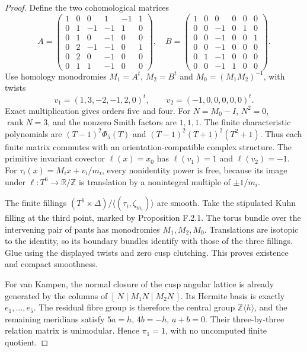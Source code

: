 \begin{proof}
Define the two cohomological matrices
\[
A=\begin{pmatrix}
1&0&0&1&-1&1\\0&1&-1&-1&1&0\\0&1&0&-1&0&0\\
0&2&-1&-1&0&1\\0&2&0&-1&0&0\\0&1&1&-1&0&0
\end{pmatrix},\quad
B=\begin{pmatrix}
1&0&0&0&0&0\\0&0&-1&0&1&0\\0&0&-1&0&0&1\\
0&0&-1&0&0&0\\0&1&-1&0&0&0\\0&0&-1&1&0&0
\end{pmatrix}.
\]
Use homology monodromies $M_1=A^t$, $M_2=B^t$ and
$M_0=(M_1M_2)^{-1}$, with twists
\[
 v_1=(1,3,-2,-1,2,0)^t,\qquad v_2=(-1,0,0,0,0,0)^t .
\]
Exact multiplication gives orders five and four.  For $N=M_0-I$,
$N^2=0$, $\operatorname{rank}N=3$, and the nonzero Smith factors
are $1,1,1$.  The finite characteristic polynomials are
$(T-1)^2\Phi_5(T)$ and $(T-1)^2(T+1)^2(T^2+1)$.
Thus each finite matrix commutes with an orientation-compatible
complex structure.  The primitive invariant covector
$\ell(x)=x_0$ has $\ell(v_1)=1$ and $\ell(v_2)=-1$.
For $\tau_i(x)=M_ix+v_i/m_i$, every nonidentity power is free,
because its image under $\ell:T^6\to\mathbb R/\mathbb Z$ is
translation by a nonintegral multiple of $\pm1/m_i$.

The finite fillings
$(T^6\times\Delta)/\langle(\tau_i,\zeta_{m_i})\rangle$ are smooth.
Take the stipulated Kuhn filling at the third point, marked by
Proposition F.2.1.  The torus bundle over the intervening pair of
pants has monodromies $M_1,M_2,M_0$.  Translations are isotopic to
the identity, so its boundary bundles identify with those of the
three fillings.  Glue using the displayed twists and zero cusp
clutching.  This proves existence and compact smoothness.

For van Kampen, the normal closure of the cusp angular lattice is
already generated by the columns of
$[\,N\mid M_1N\mid M_2N\,]$.
Its Hermite basis is exactly $e_1,\ldots,e_5$.  The residual fibre
group is therefore the central group $\mathbb Z\langle h\rangle$,
and the remaining meridians satisfy
$5a=h$, $4b=-h$, $a+b=0$.
Their three-by-three relation matrix is unimodular.  Hence
$\pi_1=1$, with no uncomputed finite quotient.


\end{proof}
